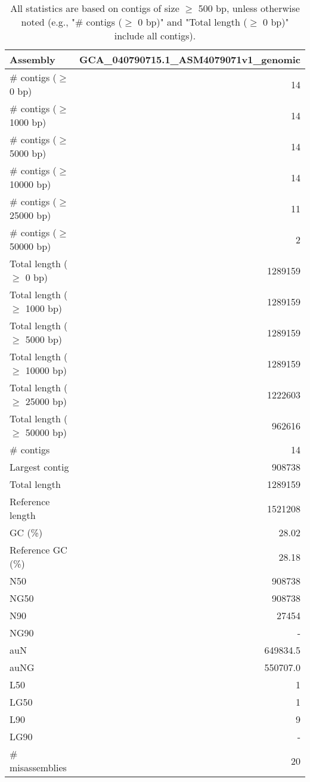 \documentclass[12pt,a4paper]{article}
\begin{document}
\begin{table}[ht]
\begin{center}
\caption{All statistics are based on contigs of size $\geq$ 500 bp, unless otherwise noted (e.g., "\# contigs ($\geq$ 0 bp)" and "Total length ($\geq$ 0 bp)" include all contigs).}
\begin{tabular}{|l*{1}{|r}|}
\hline
Assembly & GCA\_040790715.1\_ASM4079071v1\_genomic \\ \hline
\# contigs ($\geq$ 0 bp) & 14 \\ \hline
\# contigs ($\geq$ 1000 bp) & 14 \\ \hline
\# contigs ($\geq$ 5000 bp) & 14 \\ \hline
\# contigs ($\geq$ 10000 bp) & 14 \\ \hline
\# contigs ($\geq$ 25000 bp) & 11 \\ \hline
\# contigs ($\geq$ 50000 bp) & 2 \\ \hline
Total length ($\geq$ 0 bp) & 1289159 \\ \hline
Total length ($\geq$ 1000 bp) & 1289159 \\ \hline
Total length ($\geq$ 5000 bp) & 1289159 \\ \hline
Total length ($\geq$ 10000 bp) & 1289159 \\ \hline
Total length ($\geq$ 25000 bp) & 1222603 \\ \hline
Total length ($\geq$ 50000 bp) & 962616 \\ \hline
\# contigs & 14 \\ \hline
Largest contig & 908738 \\ \hline
Total length & 1289159 \\ \hline
Reference length & 1521208 \\ \hline
GC (\%) & 28.02 \\ \hline
Reference GC (\%) & 28.18 \\ \hline
N50 & 908738 \\ \hline
NG50 & 908738 \\ \hline
N90 & 27454 \\ \hline
NG90 & - \\ \hline
auN & 649834.5 \\ \hline
auNG & 550707.0 \\ \hline
L50 & 1 \\ \hline
LG50 & 1 \\ \hline
L90 & 9 \\ \hline
LG90 & - \\ \hline
\# misassemblies & 20 \\ \hline

\end{tabular}
\end{center}
\end{table}
\end{document}
